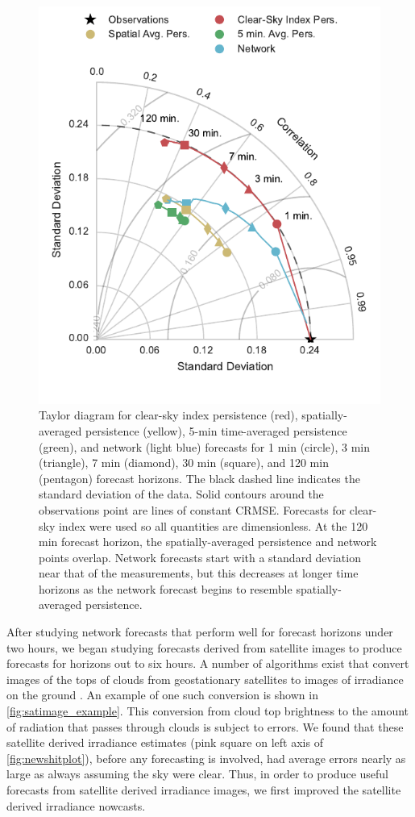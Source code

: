 \begin{figure}[htbp]
\centering
\includegraphics[width=.7\textwidth]{figs/taylor_diagram.pdf}
\caption[Taylor diagram for the network and various persistence
forecasts]{Taylor diagram for clear-sky index persistence (red),
  spatially-averaged persistence (yellow), 5-min time-averaged
  persistence (green), and network (light blue) forecasts for 1 min
  (circle), 3 min (triangle), 7 min (diamond), 30 min (square), and
  120 min (pentagon) forecast horizons. The black dashed line
  indicates the standard deviation of the data. Solid contours around
  the observations point are lines of constant CRMSE. Forecasts for
  clear-sky index were used so all quantities are dimensionless. At
  the 120 min forecast horizon, the spatially-averaged persistence and
  network points overlap. Network forecasts start with a standard
  deviation near that of the measurements, but this decreases at
  longer time horizons as the network forecast begins to resemble
  spatially-averaged persistence.
}
\label{fig:taylor}
\end{figure}

After studying network forecasts that perform well for forecast
horizons under two hours, we began studying forecasts derived from
satellite images to produce forecasts for horizons out to six hours.
A number of algorithms exist that convert images of the tops of clouds
from geostationary satellites to images of irradiance on the ground
\citep{Kim2016,Perez2002,Rigollier2004,Gautier1980}.
An example of one such conversion is shown in
\cref{fig:satimage_example}.
This conversion from cloud top brightness to the amount of radiation
that passes through clouds is subject to errors.
We found that these satellite derived irradiance estimates (pink
square on left axis of \cref{fig:newshitplot}), before any forecasting
is involved, had average errors nearly as large as always assuming the
sky were clear.
Thus, in order to produce useful forecasts from satellite derived
irradiance images, we first improved the satellite derived irradiance
nowcasts.

